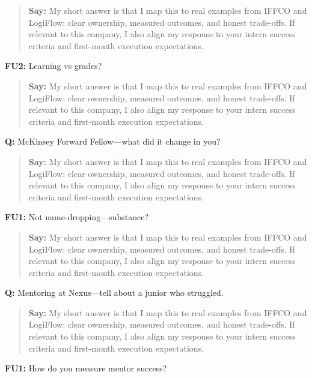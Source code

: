 \documentclass[9pt,a4paper]{article}
\begin{document}
\begin{quote}\small\textbf{Say:} My short answer is that I map this to real examples from IFFCO and LogiFlow: clear ownership, measured outcomes, and honest trade-offs. If relevant to this company, I also align my response to your intern success criteria and first-month execution expectations.\end{quote}
\vspace{2mm}
\textbf{FU2:} Learning vs grades?

\begin{quote}\small\textbf{Say:} My short answer is that I map this to real examples from IFFCO and LogiFlow: clear ownership, measured outcomes, and honest trade-offs. If relevant to this company, I also align my response to your intern success criteria and first-month execution expectations.\end{quote}
\vspace{2mm}
\textbf{Q:} McKinsey Forward Fellow---what did it change in you?

\begin{quote}\small\textbf{Say:} My short answer is that I map this to real examples from IFFCO and LogiFlow: clear ownership, measured outcomes, and honest trade-offs. If relevant to this company, I also align my response to your intern success criteria and first-month execution expectations.\end{quote}
\vspace{2mm}
\textbf{FU1:} Not name-dropping---substance?

\begin{quote}\small\textbf{Say:} My short answer is that I map this to real examples from IFFCO and LogiFlow: clear ownership, measured outcomes, and honest trade-offs. If relevant to this company, I also align my response to your intern success criteria and first-month execution expectations.\end{quote}
\vspace{2mm}
\textbf{Q:} Mentoring at Nexus---tell about a junior who struggled.

\begin{quote}\small\textbf{Say:} My short answer is that I map this to real examples from IFFCO and LogiFlow: clear ownership, measured outcomes, and honest trade-offs. If relevant to this company, I also align my response to your intern success criteria and first-month execution expectations.\end{quote}
\vspace{2mm}
\textbf{FU1:} How do you measure mentor success?
\end{document}
